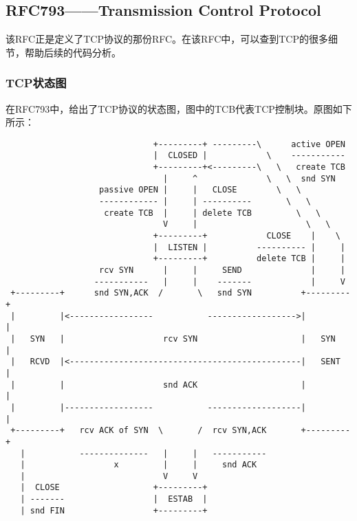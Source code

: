 \subsection{RFC793——Transmission Control Protocol}
\label{subsec:rfc793}

该RFC正是定义了TCP协议的那份RFC。在该RFC中，可以查到TCP的很多细节，帮助后续的代码分析。

\subsubsection{TCP状态图}
在RFC793中，给出了TCP协议的状态图，图中的TCB代表TCP控制块。原图如下所示：
\begin{verbatim}
                              +---------+ ---------\      active OPEN  
                              |  CLOSED |            \    -----------  
                              +---------+<---------\   \   create TCB  
                                |     ^              \   \  snd SYN    
                   passive OPEN |     |   CLOSE        \   \           
                   ------------ |     | ----------       \   \         
                    create TCB  |     | delete TCB         \   \       
                                V     |                      \   \     
                              +---------+            CLOSE    |    \   
                              |  LISTEN |          ---------- |     |  
                              +---------+          delete TCB |     |  
                   rcv SYN      |     |     SEND              |     |  
                  -----------   |     |    -------            |     V  
 +---------+      snd SYN,ACK  /       \   snd SYN          +---------+
 |         |<-----------------           ------------------>|         |
 |   SYN   |                    rcv SYN                     |   SYN   |
 |   RCVD  |<-----------------------------------------------|   SENT  |
 |         |                    snd ACK                     |         |
 |         |------------------           -------------------|         |
 +---------+   rcv ACK of SYN  \       /  rcv SYN,ACK       +---------+
   |           --------------   |     |   -----------                  
   |                  x         |     |     snd ACK                    
   |                            V     V                                
   |  CLOSE                   +---------+                              
   | -------                  |  ESTAB  |                              
   | snd FIN                  +---------+                              

\end{verbatim}
